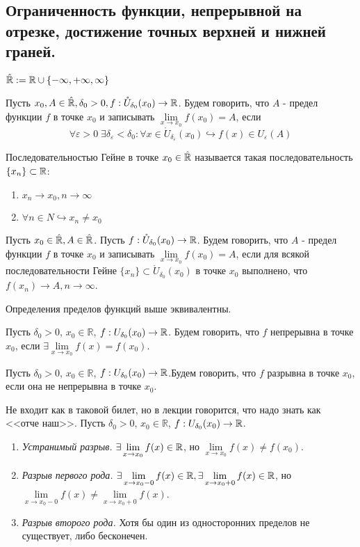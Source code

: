 \subsection{Ограниченность функции, непрерывной на отрезке, достижение точных верхней и нижней граней.}

\Def $\hat {\mathbb{R}} := \mathbb{R} \cup \{ -\infty, +\infty, \infty \}$

\Def Пусть $x_0, A \in \hat{\mathbb{R}}, \delta_0 > 0, f: \mathring U_{\delta_0}(x_0) \to \mathbb{R}$. Будем говорить, что $A$ - предел функции $f$ в точке $x_0$ и записывать $\lim\limits_{x \to x_0} f(x_0) = A$, если
\begin{equation*}
    \forall \varepsilon > 0 \; \exists \delta_\varepsilon < \delta_0: \forall x \in \mathring U_{\delta_\varepsilon}(x_0) \hookrightarrow f(x) \in U_\varepsilon(A)
\end{equation*}

\Def Последовательностью Гейне в точке $x_0 \in \hat{\mathbb{R}}$ называется такая последовательность $\{x_n\} \subset \mathbb{R}$:
\begin{enumerate}
    \item $x_n \to x_0, n \to \infty$
    \item $\forall n \in N \hookrightarrow x_n \neq x_0$
\end{enumerate}

\Def Пусть $x_0 \in \hat{\mathbb{R}}, A \in \hat{\mathbb{R}}$. Пусть $f: \mathring U_{\delta_0}(x_0) \to \mathbb{R}$. 
Будем говорить, что $A$ - предел функции $f$ в точке $x_0$ и записывать $\lim\limits_{x \to x_0} f(x_0) = A$, если для всякой последовательности Гейне $\{x_n\} \subset \mathring U_{\delta_0}(x_0)$ в точке $x_0$ выполнено, что $f(x_n) \to A, n \to \infty$.

\Th Определения пределов функций выше эквивалентны.

\Def Пусть $\delta_0 > 0$, $x_0 \in \mathbb{R}$, $f: U_{\delta_0} (x_0) \to \mathbb{R}$. Будем говорить, что $f$ непрерывна в точке $x_0$, если $\exists \lim\limits_{x \to x_0} f(x) = f(x_0)$.

\Def Пусть $\delta_0 > 0$, $x_0 \in \mathbb{R}$, $f: U_{\delta_0} (x_0) \to \mathbb{R}$.Будем говорить, что $f$ разрывна в точке $x_0$, если она не непрерывна в точке $x_0$.

\Note Не входит как в таковой билет, но в лекции говорится, что надо знать как <<отче наш>>. Пусть $\delta_0 > 0$, $x_0 \in \mathbb{R}$, $f: U_{\delta_0} (x_0) \to \mathbb{R}$.
\begin{enumerate}
    \item \textit{Устранимый разрыв.} $\exists \lim\limits_{x \to x_0} f(x) \in \mathbb{R}$, но $\lim\limits_{x \to x_0} f(x) \neq f(x_0)$.
    \item \textit{Разрыв первого рода.} $\exists \lim\limits_{x \to x_0 - 0} f(x) \in \mathbb{R}, \exists \lim\limits_{x \to x_0 + 0} f(x) \in \mathbb{R}$, но $\lim\limits_{x \to x_0 - 0} f(x) \neq \lim\limits_{x \to x_0 + 0} f(x)$.
    \item \textit{Разрыв второго рода.} Хотя бы один из односторонних пределов не существует, либо бесконечен.
\end{enumerate}

